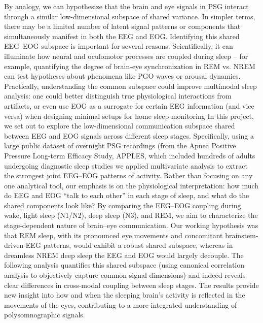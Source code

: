 By analogy, we can hypothesize that the brain and eye signals in PSG interact through a similar low-dimensional subspace of shared variance. In simpler terms, there may be a limited number of latent signal patterns or components that simultaneously manifest in both the EEG and EOG. Identifying this shared EEG–EOG subspace is important for several reasons. Scientifically, it can illuminate how neural and oculomotor processes are coupled during sleep – for example, quantifying the degree of brain-eye synchronization in REM vs. NREM can test hypotheses about phenomena like PGO waves or arousal dynamics. Practically, understanding the common subspace could improve multimodal sleep analysis: one could better distinguish true physiological interactions from artifacts, or even use EOG as a surrogate for certain EEG information (and vice versa) when designing minimal setups for home sleep monitoring %
In this project, we set out to explore the low-dimensional communication subspace shared between EEG and EOG signals across different sleep stages. Specifically, using a large public dataset of overnight PSG recordings (from the Apnea Positive Pressure Long-term Efficacy Study, APPLES, which included hundreds of adults undergoing diagnostic sleep studies %
we applied multivariate analysis to extract the strongest joint EEG–EOG patterns of activity. Rather than focusing on any one analytical tool, our emphasis is on the physiological interpretation: how much do EEG and EOG “talk to each other” in each stage of sleep, and what do the shared components look like? By comparing the EEG–EOG coupling during wake, light sleep (N1/N2), deep sleep (N3), and REM, we aim to characterize the stage-dependent nature of brain–eye communication. Our working hypothesis was that REM sleep, with its pronounced eye movements and concomitant brainstem-driven EEG patterns, would exhibit a robust shared subspace, whereas in dreamless NREM deep sleep the EEG and EOG would largely decouple. The following analysis quantifies this shared subspace (using canonical correlation analysis to objectively capture common signal dimensions) and indeed reveals clear differences in cross-modal coupling between sleep stages. The results provide new insight into how and when the sleeping brain’s activity is reflected in the movements of the eyes, contributing to a more integrated understanding of polysomnographic signals.
 
